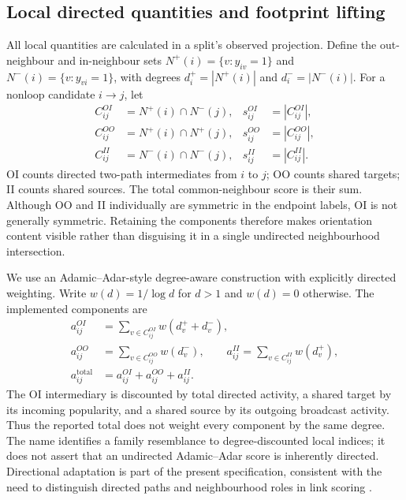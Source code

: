 \documentclass[10pt]{article}
\begin{document}
\subsection{Local directed quantities and footprint lifting}
All local quantities are calculated in a split's observed projection. Define the out-neighbour and in-neighbour sets $N^+(i)=\{v:y_{iv}=1\}$ and $N^-(i)=\{v:y_{vi}=1\}$, with degrees $d_i^+=|N^+(i)|$ and $d_i^-=|N^-(i)|$. For a nonloop candidate $i\to j$, let
\begin{align}
C^{OI}_{ij}&=N^+(i)\cap N^-(j),&s^{OI}_{ij}&=|C^{OI}_{ij}|,\\
C^{OO}_{ij}&=N^+(i)\cap N^+(j),&s^{OO}_{ij}&=|C^{OO}_{ij}|,\\
C^{II}_{ij}&=N^-(i)\cap N^-(j),&s^{II}_{ij}&=|C^{II}_{ij}|.
\label{eq:cn}
\end{align}
OI counts directed two-path intermediates from $i$ to $j$; OO counts shared targets; II counts shared sources. The total common-neighbour score is their sum. Although OO and II individually are symmetric in the endpoint labels, OI is not generally symmetric. Retaining the components therefore makes orientation content visible rather than disguising it in a single undirected neighbourhood intersection.

We use an Adamic--Adar-style degree-aware construction with explicitly directed weighting. Write $w(d)=1/\log d$ for $d>1$ and $w(d)=0$ otherwise. The implemented components are
\begin{align}
a^{OI}_{ij}&=\sum_{v\in C^{OI}_{ij}}w(d_v^++d_v^-),\\
a^{OO}_{ij}&=\sum_{v\in C^{OO}_{ij}}w(d_v^-),\qquad
 a^{II}_{ij}=\sum_{v\in C^{II}_{ij}}w(d_v^+),\\
a^{\mathrm{total}}_{ij}&=a^{OI}_{ij}+a^{OO}_{ij}+a^{II}_{ij}.
\label{eq:aa}
\end{align}
The OI intermediary is discounted by total directed activity, a shared target by its incoming popularity, and a shared source by its outgoing broadcast activity. Thus the reported total does not weight every component by the same degree. The name identifies a family resemblance to degree-discounted local indices; it does not assert that an undirected Adamic--Adar score is inherently directed. Directional adaptation is part of the present specification, consistent with the need to distinguish directed paths and neighbourhood roles in link scoring \citep{luZhou2011}.
\end{document}
